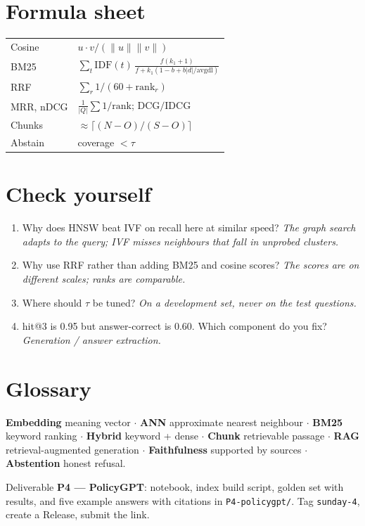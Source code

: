 \documentclass[11pt,a4paper]{article}
\begin{document}
\section*{Formula sheet}
\begin{tabularx}{\linewidth}{@{}l X@{}}
\toprule
Cosine & $u\cdot v/(\lVert u\rVert\lVert v\rVert)$\\
BM25 & $\sum_t\mathrm{IDF}(t)\,\frac{f(k_1+1)}{f+k_1(1-b+b|d|/\mathrm{avgdl})}$\\
RRF & $\sum_r 1/(60+\mathrm{rank}_r)$\\
MRR, nDCG & $\frac1{|Q|}\sum 1/\mathrm{rank}$; \; DCG$/$IDCG\\
Chunks & $\approx\lceil (N-O)/(S-O)\rceil$\\
Abstain & coverage $<\tau$\\
\bottomrule
\end{tabularx}

\section*{Check yourself}
\begin{enumerate}
\item Why does HNSW beat IVF on recall here at similar speed? \emph{The graph search adapts to the query; IVF misses neighbours that fall in unprobed clusters.}
\item Why use RRF rather than adding BM25 and cosine scores? \emph{The scores are on different scales; ranks are comparable.}
\item Where should $\tau$ be tuned? \emph{On a development set, never on the test questions.}
\item hit@3 is 0.95 but answer-correct is 0.60. Which component do you fix? \emph{Generation / answer extraction.}
\end{enumerate}

\section*{Glossary}
\textbf{Embedding} meaning vector $\cdot$ \textbf{ANN} approximate nearest neighbour $\cdot$ \textbf{BM25} keyword ranking $\cdot$ \textbf{Hybrid} keyword + dense $\cdot$ \textbf{Chunk} retrievable passage $\cdot$ \textbf{RAG} retrieval-augmented generation $\cdot$ \textbf{Faithfulness} supported by sources $\cdot$ \textbf{Abstention} honest refusal.

\begin{submitbox}
Deliverable \textbf{P4 --- PolicyGPT}: notebook, index build script, golden set with results, and five example answers with citations in \texttt{P4-policygpt/}. Tag \texttt{sunday-4}, create a Release, submit the link.
\end{submitbox}


\end{document}
